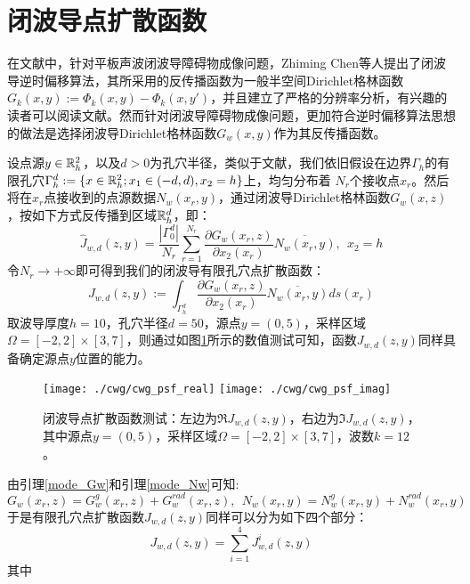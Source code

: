 \section{闭波导点扩散函数}
在文献\cite{ch_cw}中，针对平板声波闭波导障碍物成像问题，Zhiming Chen等人提出了闭波导逆时偏移算法，其所采用的反传播函数为一般半空间Dirichlet格林函数$G_{k}(x,y):=\Phi_k(x,y)-\Phi_k(x,y')$，并且建立了严格的分辨率分析，有兴趣的读者可以阅读文献\cite{ch_cw}。然而针对闭波导障碍物成像问题，更加符合逆时偏移算法思想的做法是选择闭波导Dirichlet格林函数$G_w(x,y)$作为其反传播函数。

设点源$y\in\mathbb{R}_h^2$，以及$d>0$为孔穴半径，类似于文献\cite{ch_cw}，我们依旧假设在边界$\Gamma_h$的有限孔穴$\Gamma_h^d:=\{x\in\mathbb{R}^2_h;x_1\in(-d,d),x_2=h\}$上，均匀分布着
$N_r$个接收点$x_r$。然后将在$x_r$点接收到的点源数据$N_w(x_r,y)$，通过闭波导Dirichlet格林函数$G_w(x,z)$，按如下方式反传播到区域$\mathbb{R}_h^d$，即：
\begin{equation}
 \hat J_{w,d}(z,y)=\frac{|\Gamma_0^d|}{N_r}\sum\limits_{r=1}^{N_r}\frac{\partial G_w(x_r,z)}{\partial x_2(x_r)}{\overline{N_w(x_r,y)}}, \  \ x_2=h
\end{equation}
令$N_r\rightarrow+\infty$即可得到我们的闭波导有限孔穴点扩散函数：
\begin{equation}
 J_{w,d}(z,y):=\int_{\Gamma_h^d}\frac{\partial G_w(x_r,z)}{\partial x_2(x_r)}\overline{N_w(x_r,y)}ds(x_r)
\end{equation}
取波导厚度$h=10$，孔穴半径$d=50$，源点$y=(0,5)$，采样区域$\Omega=[-2,2]\times[3,7]$，则通过如图\ref{cwg_psf}所示的数值测试可知，函数$J_{w,d}(z,y)$同样具备确定源点$y$位置的能力。
\begin{figure}
	\centering
	\texttt{[image: ./cwg/cwg\_psf\_real]}
	\texttt{[image: ./cwg/cwg\_psf\_imag]}
	\caption{闭波导点扩散函数测试：左边为$\Re J_{w,d}(z,y)$，右边为$\Im J_{w,d}(z,y)$，其中源点$y=(0,5)$，采样区域$\Omega=[-2,2]\times[3,7]$，波数$k=12$。}
	\label{cwg_psf}
\end{figure}
由引理\ref{mode_Gw}和引理\ref{mode_Nw}可知:
\begin{equation}
 G_w(x_r,z)=G^g_w(x_r,z)+G^{rad}_w(x_r,z),\ \ 
 N_w(x_r,y)=N^g_w(x_r,y)+N^{rad}_w(x_r,y)
\end{equation}
于是有限孔穴点扩散函数$J_{w,d}(z,y)$同样可以分为如下四个部分：
\begin{equation}
 J_{w,d}(z,y)=\sum\limits_{i=1}^4J^i_{w,d}(z,y)
\end{equation}
其中
